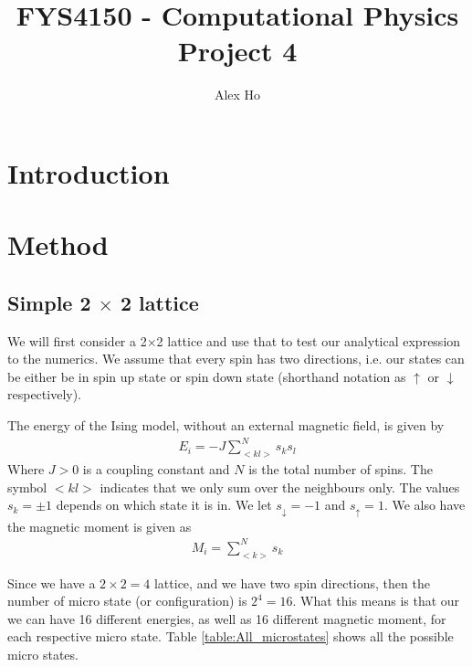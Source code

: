 \documentclass[12pt]{article}
\author{Alex Ho}
\title{FYS4150 - Computational Physics \\ Project 4}
\begin{document}
\maketitle
\section*{Introduction}
\section*{Method}

\subsection*{Simple 2 $\times$ 2 lattice}
We will first consider a 2$\times$2 lattice and use that to test our analytical expression to the numerics. We assume that every spin has two directions, i.e. our states can be either be in spin up state or spin down state (shorthand notation as $\uparrow$ or $\downarrow$ respectively).

The energy of the Ising model, without an external magnetic field, is given by
\begin{align*}
E_i = \displaystyle -J \sum_{<kl>}^Ns_k s_l
\end{align*} 
Where $J > 0$ is a coupling constant and $N$ is the total number of spins. The symbol $<kl>$ indicates that we only sum over the neighbours only. The values $s_k = \pm 1$ depends on which state it is in. We let $s_{\downarrow} = -1$ and $s_{\uparrow} = 1$. We also have the magnetic moment is given as
\begin{align*}
M_i = \displaystyle \sum_{<k>}^N s_k
\end{align*}

Since we have a $2\times2=4$ lattice, and we have two spin directions, then the number of micro state (or configuration) is $2^4 = 16$. What this means is that our we can have 16 different energies, as well as 16 different magnetic moment, for each respective micro state. Table \ref{table:All_microstates} shows all the possible micro states.
\end{document}
